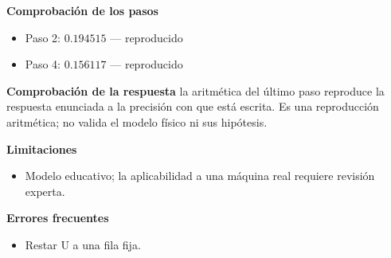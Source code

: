 \documentclass[10pt,openany]{book}
\begin{document}
\begin{tcolorbox}[title={Problema resuelto 2}, studiumworked, breakable]
\noindent\textbf{Comprobación de los pasos}
\begin{itemize}
\item Paso 2: $0.194515$ — reproducido
\item Paso 4: $0.156117$ — reproducido
\end{itemize}

\noindent\textbf{Comprobación de la respuesta} la aritmética del último paso reproduce la respuesta enunciada a la precisión con que está escrita. Es una reproducción aritmética; no valida el modelo físico ni sus hipótesis.

\noindent\textbf{Limitaciones}
\begin{itemize}
\item Modelo educativo; la aplicabilidad a una máquina real requiere revisión experta.
\end{itemize}

\noindent\textbf{Errores frecuentes}
\begin{itemize}
\item Restar U a una fila fija.
\end{itemize}
\end{tcolorbox}
\end{document}
